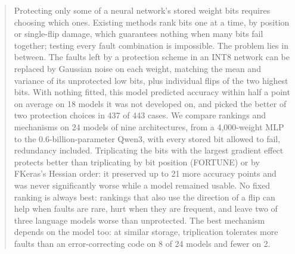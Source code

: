 \documentclass[manuscript,screen,review]{acmart}
\begin{document}
\begin{abstract}
Protecting only some of a neural network's stored weight bits requires choosing which ones. Existing methods rank bits one at a time, by position or single-flip damage, which guarantees nothing when many bits fail together; testing every fault combination is impossible. The problem lies in between. The faults left by a protection scheme in an INT8 network can be replaced by Gaussian noise on each weight, matching the mean and variance of its unprotected low bits, plus individual flips of the two highest bits. With nothing fitted, this model predicted accuracy within half a point on average on 18 models it was not developed on, and picked the better of two protection choices in 437 of 443 cases. We compare rankings and mechanisms on 24 models of nine architectures, from a 4,000-weight MLP to the 0.6-billion-parameter Qwen3, with every stored bit allowed to fail, redundancy included. Triplicating the bits with the largest gradient effect protects better than triplicating by bit position (FORTUNE) or by FKeras's Hessian order: it preserved up to 21 more accuracy points and was never significantly worse while a model remained usable. No fixed ranking is always best: rankings that also use the direction of a flip can help when faults are rare, hurt when they are frequent, and leave two of three language models worse than unprotected. The best mechanism depends on the model too: at similar storage, triplication tolerates more faults than an error-correcting code on 8 of 24 models and fewer on 2.
\end{abstract}
\maketitle












\end{document}
